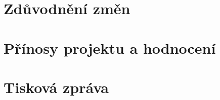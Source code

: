 \documentclass[a4paper,11pt]{article}
\begin{document}













\section{Zdůvodnění změn}





\section{Přínosy projektu a hodnocení}



\section{Tisková zpráva}
\end{document}
